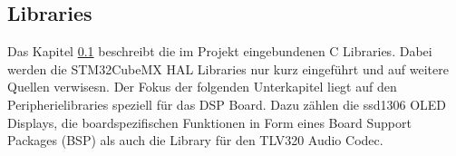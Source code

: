 \subsection{Libraries}
\label{sec:Libraries}

Das Kapitel \ref{sec:Libraries} beschreibt die im Projekt eingebundenen C Libraries.
Dabei werden die STM32CubeMX HAL Libraries nur kurz eingeführt und auf weitere Quellen verwisesn.
Der Fokus der folgenden Unterkapitel liegt auf den Peripherielibraries speziell für das DSP Board. 
Dazu zählen die ssd1306 OLED Displays, die boardspezifischen Funktionen in Form eines Board Support Packages (BSP) als auch die Library für den TLV320 Audio Codec.
